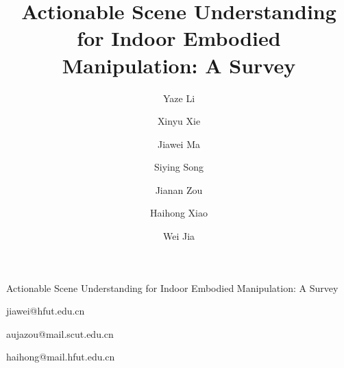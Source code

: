 \documentclass{SCIS2026}
\begin{document}
\DOI{}
\ArtNo{}
\ReceiveDate{}
\ReviseDate{}
\AcceptDate{}
\OnlineDate{}
\AuthorMark{}
\AuthorCitation{}

\title{Actionable Scene Understanding for Indoor Embodied Manipulation: A Survey}{Actionable Scene Understanding for Indoor Embodied Manipulation: A Survey}

\author[1\dag]{Yaze Li}{}
\author[1\dag]{Xinyu Xie}{}
\author[1\dag]{Jiawei Ma}{{jiawei@hfut.edu.cn}}
\author[1\dag]{Siying Song}{}
\author[2]{Jianan Zou}{{aujazou@mail.scut.edu.cn}}
\author[1]{Haihong Xiao}{{haihong@mail.hfut.edu.cn}}
\author[1]{Wei Jia}{}


\address[1]{School of Computer Science and Information Engineering, Hefei University of Technology, Hefei, China}
\address[2]{School of Automation Science and Engineering, South China University of Technology, Guangzhou, China}
\end{document}
